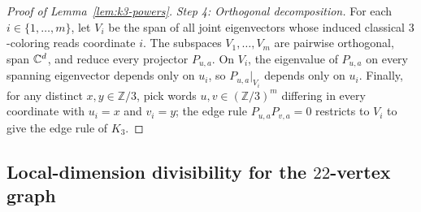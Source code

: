 \begin{proof}[Proof of Lemma~\ref{lem:k3-powers}]
\emph{Step 4: Orthogonal decomposition.} For each $i\in\{1,\ldots,m\}$, let $V_i$ be the span of all joint eigenvectors whose induced classical $3$-coloring reads coordinate $i$. The subspaces $V_1,\ldots,V_m$ are pairwise orthogonal, span $\mathbb C^d$, and reduce every projector $P_{u,a}$. On $V_i$, the eigenvalue of $P_{u,a}$ on every spanning eigenvector depends only on $u_i$, so $P_{u,a}|_{V_i}$ depends only on $u_i$. Finally, for any distinct $x,y\in\mathbb Z/3$, pick words $u,v\in(\mathbb Z/3)^m$ differing in every coordinate with $u_i=x$ and $v_i=y$; the edge rule $P_{u,a}P_{v,a}=0$ restricts to $V_i$ to give the edge rule of $K_3$.
\end{proof}

\subsection{Local-dimension divisibility for the \texorpdfstring{$22$}{22}-vertex graph}\label{app:small-dimension}


